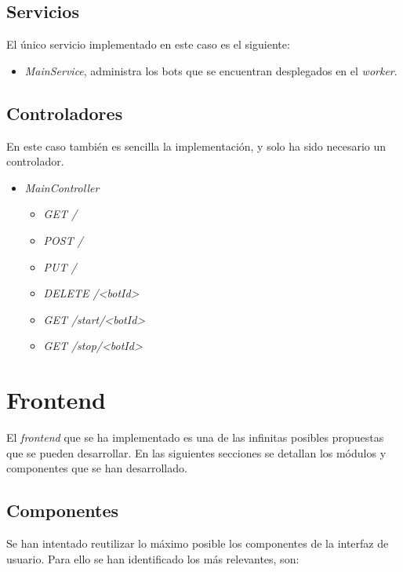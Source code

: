 \subsection{Servicios}

El único servicio implementado en este caso es el siguiente:

\begin{itemize}
	\item \textit{MainService}, administra los bots que se encuentran desplegados en el \textit{worker}.
\end{itemize}

\subsection{Controladores}

En este caso también es sencilla la implementación, y solo ha sido necesario un controlador.

\begin{itemize}
	\item \textit{MainController}
	\begin{itemize}
		\item \textit{GET /}
		\item \textit{POST /}
		\item \textit{PUT /}
		\item \textit{DELETE /<botId>}
		\item \textit{GET /start/<botId>}
		\item \textit{GET /stop/<botId>}
	\end{itemize}
\end{itemize}





\section{Frontend}

El \textit{frontend} que se ha implementado es una de las infinitas posibles propuestas que se pueden desarrollar. En las siguientes secciones se detallan los módulos y componentes que se han desarrollado.

\subsection{Componentes}

Se han intentado reutilizar lo máximo posible los componentes de la interfaz de usuario. Para ello se han identificado los más relevantes, son:

